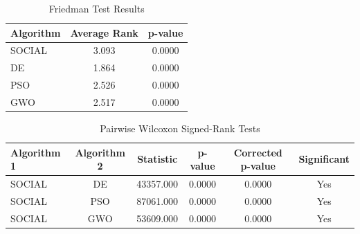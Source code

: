 \begin{table}[h]
\centering
\caption{Friedman Test Results}
\begin{tabular}{lcc}
\hline
Algorithm & Average Rank & p-value \\
\hline
SOCIAL & 3.093 & 0.0000 \\
DE & 1.864 & 0.0000 \\
PSO & 2.526 & 0.0000 \\
GWO & 2.517 & 0.0000 \\
\hline
\end{tabular}
\end{table}



\begin{table}[h]
\centering
\caption{Pairwise Wilcoxon Signed-Rank Tests}
\begin{tabular}{lccccc}
\hline
Algorithm 1 & Algorithm 2 & Statistic & p-value & Corrected p-value & Significant \\
\hline
SOCIAL & DE & 43357.000 & 0.0000 & 0.0000 & Yes \\
SOCIAL & PSO & 87061.000 & 0.0000 & 0.0000 & Yes \\
SOCIAL & GWO & 53609.000 & 0.0000 & 0.0000 & Yes \\
\hline
\end{tabular}
\end{table}